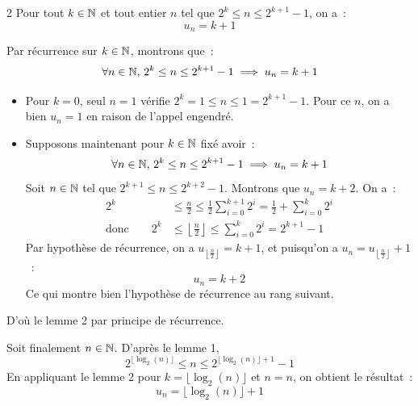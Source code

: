 \begin{lemme}{2}{}
    Pour tout $k \in \mathbb{N}$  et tout entier $n$ tel que $2^k \leq n \leq 2^{k+1}-1$, on a~:
    $$u_n = k + 1$$
\end{lemme}

\begin{demonstration}
    Par récurrence sur $k \in \mathbb{N}$, montrons que~:
    $$\forall n \in \mathbb{N},\, 2^k \leq n \leq 2^{k+1} - 1 \implies u_n = k + 1$$
    \begin{itemize}
        \item Pour $k = 0$, seul $n = 1$ vérifie $2^k = 1 \leq n \leq 1 = 2^{k+1}-1$. Pour ce $n$, on a bien $u_n = 1$ en raison de l'appel  engendré.
        \item Supposons maintenant pour $k \in \mathbb{N}$ fixé avoir~:
        $$\forall n \in \mathbb{N},\, 2^k \leq n \leq 2^{k+1} - 1 \implies u_n = k + 1$$
        Soit $n \in \mathbb{N}$ tel que $2^{k+1} \leq n \leq 2^{k+2}-1$. Montrons que $u_n = k+2$. On a~:
        \begin{align*}
            2^k &\leq \frac{n}{2} \leq \frac{1}{2}\sum_{i=0}^{k+1}2^i = \frac{1}{2} +  \sum_{i=0}^k 2^i\\
            \text{donc}\qquad 2^k &\leq \left\lfloor \frac{n}{2} \right\rfloor \leq \sum_{i=0}^k 2^i = 2^{k+1} -1
        \end{align*}
        Par hypothèse de récurrence, on a $u_{\left\lfloor \frac{n}{2} \right\rfloor}= k + 1$, et puisqu'on a $u_n = u_{\left\lfloor \frac{n}{2}\right\rfloor} + 1$~:
        $$u_n = k +2$$
        Ce qui montre bien l'hypothèse de récurrence au rang suivant.
    \end{itemize}
    D'où le lemme 2 par principe de récurrence.
\end{demonstration}

Soit finalement $n \in \mathbb{N}$. D'après le lemme 1,
$$2^{\lfloor\log_2(n)\rfloor} \leq n \leq 2^{\lfloor\log_2(n)\rfloor + 1} - 1$$
En appliquant le lemme 2 pour $k = \lfloor\log_2(n)\rfloor$ et $n = n$, on obtient le résultat~:
$$u_n = \lfloor\log_2(n)\rfloor + 1$$

